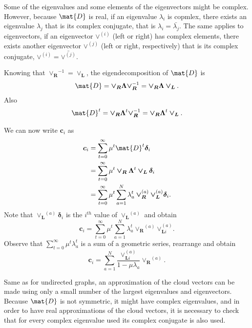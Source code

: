 \documentclass[12pt]{report}
\newcommand*\conj[1]{\bar{#1}}
\begin{document}
Some of the eigenvalues and some elements of the eigenvectors might be complex.
However, because $\mat{D}$ is real, if an eigenvalue $\lambda_i$ is copmlex,
there exists an eigenvalue $\lambda_j$ that is its complex conjugate, that is
$\lambda_i = \conj{\lambda_j}$. The same applies to eigenvectors, if an
eigenvector $\bm{\vee}^{(i)}$ (left or right) has complex elements, there exists
another eigenvector $\bm{\vee}^{(j)}$ (left or right, respectively) that is its
complex conjugate, $\bm{\vee}^{(i)} = \conj{\bm{\vee}^{(j)}}$.

Knowing that $\bm{\vee_R}^{-1} = \bm{\vee_L}$, the eigendecomposition of
$\mat{D}$ is
\begin{equation}
  \mat{D} = \bm{\vee_R} \bm{\Lambda} \bm{\vee_R}^{-1}
          = \bm{\vee_R} \bm{\Lambda} \bm{\vee_L}.
\end{equation}
Also
\begin{equation}
  \mat{D}^t = \bm{\vee_R} \bm{\Lambda}^t \bm{\vee_R}^{-1}
            = \bm{\vee_R} \bm{\Lambda}^t \bm{\vee_L}.
\end{equation}

We can now write $\bm{c}_i$ as
\begin{align}
  \bm{c}_i &= \sum_{t=0}^\infty \mu^t \mat{D}^t \bm{\delta}_i \\
   &= \sum_{t=0}^\infty \mu^t \bm{\vee_R} \bm{\Lambda}^t \bm{\vee_L}
      \bm{\delta}_i \\
   &= \sum_{t=0}^\infty \mu^t \sum_{a=1}^N \lambda_a^t \bm{\vee_R}^{(a)}
      \bm{\vee_L}^{(a)} \bm{\delta}_i.
\end{align}
Note that $\bm{\vee_L}^{(a)} \bm{\delta}_i$ is the $i^{th}$ value of
$\bm{\vee_L}^{(a)}$ and obtain
\begin{equation}
  \bm{c}_i = \sum_{t=0}^\infty \mu^t \sum_{a=1}^N \lambda_a^t \bm{\vee_R}^{(a)}
     \bm{\vee}_{\bm{L}i}^{(a)}.
\end{equation}
Observe that $\sum_{t=0}^\infty \mu^t \lambda_a^t$ is a sum of a geometric
series, rearrange and obtain
\begin{equation}
  \bm{c}_i = \sum_{a=1}^N \frac{\bm{\vee}_{\bm{L}i}^{(a)}}
             {1 - \mu \lambda_a} \bm{\vee_R}^{(a)}.
\end{equation}

Same as for undirected graphs, an approximation of the cloud vectors can be made
using only a small number of the largest eigenvalues and eigenvectors. Because
$\mat{D}$ is not symmetric, it might have complex eigenvalues, and in order to
have real approximations of the cloud vectors, it is necessary to check that for
every complex eigenvalue used its complex conjugate is also used.
\end{document}

